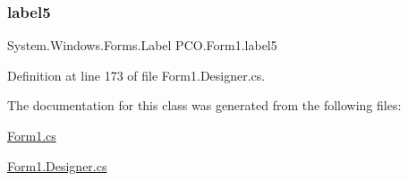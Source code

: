 \subsubsection{\texorpdfstring{label5}{label5}}
{\footnotesize\ttfamily System.\+Windows.\+Forms.\+Label P\+C\+O.\+Form1.\+label5\hspace{0.3cm}{\ttfamily [private]}}



Definition at line 173 of file Form1.\+Designer.\+cs.



The documentation for this class was generated from the following files\+:\begin{DoxyCompactItemize}
\item 
\hyperlink{Form1_8cs}{Form1.\+cs}\item 
\hyperlink{Form1_8Designer_8cs}{Form1.\+Designer.\+cs}\end{DoxyCompactItemize}
